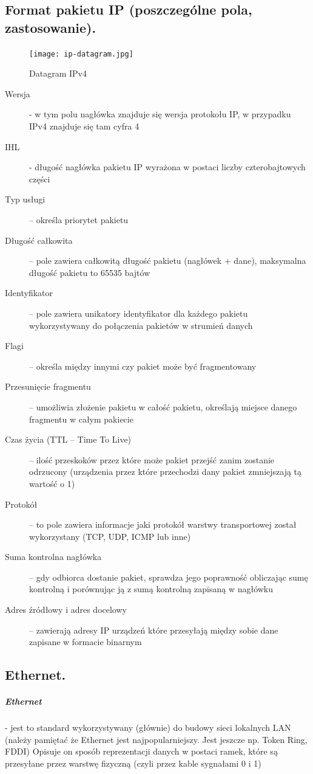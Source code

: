 \documentclass[a4paper,12pt,oneside]{book}
\begin{document}
			\newpage\subsection{Format pakietu IP (poszczególne pola, zastosowanie).}
				\begin{figure}[h!]
					\centering\texttt{[image: ip-datagram.jpg]}
					\caption{Datagram IPv4}
				\end{figure}
				\begin{description}
					\item[Wersja] - w tym polu nagłówka znajduje się wersja protokołu IP, w przypadku IPv4 znajduje się tam cyfra 4
					\item[IHL] - długość nagłówka pakietu IP wyrażona w postaci liczby czterobajtowych części
					\item[Typ usługi] – określa priorytet pakietu
					\item[Długość całkowita] – pole zawiera całkowitą długość pakietu (nagłówek + dane), maksymalna długość pakietu to 65535 bajtów
					\item[Identyfikator ]  – pole zawiera unikatory identyfikator dla każdego pakietu wykorzystywany do połączenia pakietów w strumień danych
					\item[Flagi] – określa między innymi czy pakiet może być fragmentowany
					\item[Przesunięcie fragmentu] – umożliwia złożenie pakietu w całość pakietu, określają miejsce danego fragmentu w całym pakiecie
					\item[Czas życia (TTL – Time To Live)] – ilość przeskoków przez które może pakiet przejść zanim zostanie odrzucony (urządzenia przez które przechodzi dany pakiet zmniejszają tą wartość o 1)
					\item[Protokół ] – to pole zawiera informacje jaki protokół warstwy transportowej został wykorzystany (TCP, UDP, ICMP lub inne)
					\item[Suma kontrolna nagłówka] – gdy odbiorca dostanie pakiet, sprawdza jego poprawność obliczając sumę kontrolną i porównując ją z sumą kontrolną zapisaną w nagłówku
					\item[Adres źródłowy i adres docelowy ] – zawierają adresy IP urządzeń które przesyłają między sobie dane zapisane w formacie binarnym
				\end{description}
			\newpage\subsection{Ethernet.}
				\subparagraph{Ethernet} - jest to standard wykorzystywany (głównie) do budowy sieci lokalnych LAN
				(należy pamiętać że Ethernet jest najpopularniejszy. Jest jeszcze np. Token Ring, FDDI)
				Opisuje on sposób reprezentacji danych w postaci ramek, które są przesyłane przez
				warstwę fizyczną (czyli przez kable sygnałami 0 i 1)
				
\end{document}
